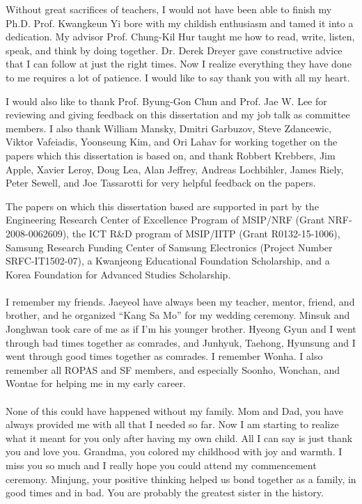 \acknowledgement

Without great sacrifices of teachers, I would not have been able to finish my Ph.D.  Prof. Kwangkeun
Yi bore with my childish enthusiasm and tamed it into a dedication.  My advisor Prof. Chung-Kil Hur
taught me how to read, write, listen, speak, and think by doing together.  Dr. Derek Dreyer gave
constructive advice that I can follow at just the right times.  Now I realize everything they have
done to me requires a lot of patience.  I would like to say thank you with all my heart.

I would also like to thank Prof. Byung-Gon Chun and Prof. Jae W. Lee for reviewing and giving
feedback on this dissertation and my job talk as committee members.  I also thank William Mansky,
Dmitri Garbuzov, Steve Zdancewic, Viktor Vafeiadis, Yoonseung Kim, and Ori Lahav for working
together on the papers which this dissertation is based on, and thank Robbert Krebbers, Jim Apple,
Xavier Leroy, Doug Lea, Alan Jeffrey, Andreas Lochbihler, James Riely, Peter Sewell, and Joe
Tassarotti for very helpful feedback on the papers.

The papers on which this dissertation based are supported in part by the Engineering Research Center
of Excellence Program of MSIP/NRF (Grant NRF-2008-0062609), the ICT R\&D program of MSIP/IITP (Grant
R0132-15-1006), Samsung Research Funding Center of Samsung Electronics (Project Number
SRFC-IT1502-07), a Kwanjeong Educational Foundation Scholarship, and a Korea Foundation for Advanced
Studies Scholarship.


\paragraph*{}

I remember my friends.  Jaeyeol have always been my teacher, mentor, friend, and brother, and he
organized ``Kang Sa Mo'' for my wedding ceremony.  Minsuk and Jonghwan took care of me as if I'm his
younger brother.  Hyeong Gyun and I went through bad times together as comrades, and Junhyuk,
Taehong, Hyunsung and I went through good times together as comrades.  I remember Wonha.  I also
remember all ROPAS and SF members, and especially Soonho, Wonchan, and Wontae for helping me in my
early career.


\paragraph*{}

None of this could have happened without my family.  Mom and Dad, you have always provided me with
all that I needed so far.  Now I am starting to realize what it meant for you only after having my
own child.  All I can say is just thank you and love you.  Grandma, you colored my childhood with
joy and warmth.  I miss you so much and I really hope you could attend my commencement ceremony.
Minjung, your positive thinking helped us bond together as a family, in good times and in bad.  You
are probably the greatest sister in the history.


